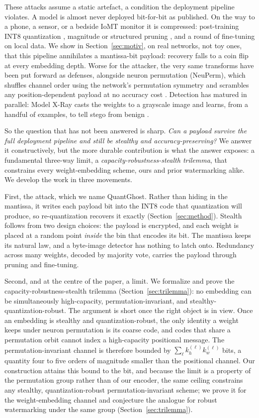 \documentclass[a4paper,fleqn]{cas-dc}
\theoremstyle{plain}
\theoremstyle{remark}
\newcommand{\sys}{\mbox{QuantGhost}}
\begin{document}
These attacks assume a static artefact, a condition the deployment pipeline violates. A
model is almost never deployed bit-for-bit as published. On the way to a phone, a sensor, or a bedside IoMT
monitor it is compressed: post-training INT8 quantization \cite{jacob2018quantization},
magnitude or structured pruning \cite{han2015learning,han2016deepcompression}, and a
round of fine-tuning on local data. We show in Section~\ref{sec:motiv}, on real
networks, not toy ones, that this pipeline annihilates a mantissa-bit payload:
recovery falls to a coin flip at every embedding depth. Worse for the attacker, the
very same transforms have been put forward as defenses, alongside neuron permutation
(NeuPerm), which shuffles channel order using the network's permutation symmetry and
scrambles any position-dependent payload at no accuracy cost
\cite{gilkarov2025neuperm}. Detection has matured in parallel: Model X-Ray casts the
weights to a grayscale image and learns, from a handful of examples, to tell stego
from benign \cite{gilkarov2026modelxray}.

So the question that has not been answered is sharp. \emph{Can a payload survive the
full deployment pipeline and still be stealthy and accuracy-preserving?} We answer it
constructively, but the more durable contribution is what the answer exposes: a
fundamental three-way limit, a \emph{capacity-robustness-stealth trilemma}, that
constrains every weight-embedding scheme, ours and prior watermarking alike. We develop
the work in three movements.

First, the attack, which we name \sys. Rather than hiding in the mantissa, it writes
each payload bit into the INT8 code that quantization will produce, so re-quantization
recovers it exactly (Section~\ref{sec:method}). Stealth follows from two design choices:
the payload is encrypted, and each weight is placed at a random point \emph{inside} the
bin that encodes its bit. The mantissa keeps its natural law, and a byte-image detector has nothing to
latch onto. Redundancy across many weights, decoded by majority vote, carries the
payload through pruning and fine-tuning.

Second, and at the centre of the paper, a limit. We formalize and prove the
capacity-robustness-stealth trilemma (Section~\ref{sec:trilemma}): no embedding can be
simultaneously high-capacity, permutation-invariant, and stealthy-quantization-robust.
The argument is short once the right object is in view. Once an embedding is stealthy
and quantization-robust, the only identity a weight keeps under neuron permutation is
its coarse code, and codes that share a permutation orbit cannot index a high-capacity
positional message. The permutation-invariant channel is therefore bounded by
$\sum_\ell k_h^{(\ell)} k_w^{(\ell)}$ bits, a quantity four to five orders of magnitude
smaller than the positional channel. Our construction attains this bound to the bit, and
because the limit is a property of the permutation group rather than of our encoder, the
same ceiling constrains any stealthy, quantization-robust permutation-invariant scheme; we
prove it for the weight-embedding channel and conjecture the analogue for robust watermarking
under the same group (Section~\ref{sec:trilemma}).
\end{document}
